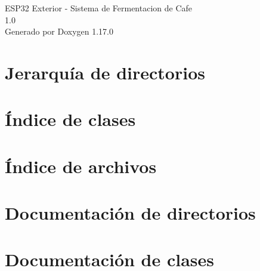 \documentclass[twoside]{book}
\newcommand{\+}{\discretionary{\mbox{\scriptsize$\hookleftarrow$}}{}{}}
\newcommand{\clearemptydoublepage}{%
    \newpage{\pagestyle{empty}\cleardoublepage}%
  }
\begin{document}
  \raggedbottom
    \hypersetup{pageanchor=false,
                bookmarksnumbered=true,
                pdfencoding=unicode
               }
  \begin{titlepage}
  \vspace*{7cm}
  \begin{center}%
  {\Large ESP32 Exterior -\/ Sistema de Fermentacion de Cafe}\\
  [1ex]\large 1.\+0 \\
  \vspace*{1cm}
  {\large Generado por Doxygen 1.17.0}\\
  \end{center}
  \end{titlepage}
  \clearemptydoublepage
  \tableofcontents
  \clearemptydoublepage
  \hypersetup{pageanchor=true}
\chapter{Jerarquía de directorios}

\chapter{Índice de clases}

\chapter{Índice de archivos}

\chapter{Documentación de directorios}






\chapter{Documentación de clases}



\end{document}
